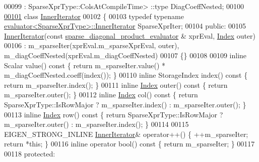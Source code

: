 \begin{DoxyCode}
00099                                                                        : SparseXprType::ColsAtCompileTime>
      ::type DiagCoeffNested;
00100   
\hyperlink{class_eigen_1_1internal_1_1sparse__diagonal__product__evaluator_3_01_sparse_xpr_type_00_01_diag_f44167c623880e382ac76ec71f78299c}{00101}   \textcolor{keyword}{class }\hyperlink{class_eigen_1_1_inner_iterator}{InnerIterator}
00102   \{
00103     \textcolor{keyword}{typedef} \textcolor{keyword}{typename} \hyperlink{struct_eigen_1_1internal_1_1evaluator}{evaluator<SparseXprType>::InnerIterator} 
      SparseXprIter;
00104   \textcolor{keyword}{public}:
00105     \hyperlink{class_eigen_1_1_inner_iterator}{InnerIterator}(\textcolor{keyword}{const} \hyperlink{struct_eigen_1_1internal_1_1sparse__diagonal__product__evaluator}{sparse\_diagonal\_product\_evaluator} &
      xprEval, \hyperlink{namespace_eigen_a62e77e0933482dafde8fe197d9a2cfde}{Index} outer)
00106       : m\_sparseIter(xprEval.m\_sparseXprEval, outer), m\_diagCoeffNested(xprEval.m\_diagCoeffNested)
00107     \{\}
00108     
00109     \textcolor{keyword}{inline} Scalar value()\textcolor{keyword}{ const }\{ \textcolor{keywordflow}{return} m\_sparseIter.value() * m\_diagCoeffNested.coeff(index()); \}
00110     \textcolor{keyword}{inline} StorageIndex index()\textcolor{keyword}{ const  }\{ \textcolor{keywordflow}{return} m\_sparseIter.index(); \}
00111     \textcolor{keyword}{inline} \hyperlink{namespace_eigen_a62e77e0933482dafde8fe197d9a2cfde}{Index} outer()\textcolor{keyword}{ const  }\{ \textcolor{keywordflow}{return} m\_sparseIter.outer(); \}
00112     \textcolor{keyword}{inline} \hyperlink{namespace_eigen_a62e77e0933482dafde8fe197d9a2cfde}{Index} col()\textcolor{keyword}{ const    }\{ \textcolor{keywordflow}{return} SparseXprType::IsRowMajor ? m\_sparseIter.index() : 
      m\_sparseIter.outer(); \}
00113     \textcolor{keyword}{inline} \hyperlink{namespace_eigen_a62e77e0933482dafde8fe197d9a2cfde}{Index} row()\textcolor{keyword}{ const    }\{ \textcolor{keywordflow}{return} SparseXprType::IsRowMajor ? m\_sparseIter.outer() : 
      m\_sparseIter.index(); \}
00114     
00115     EIGEN\_STRONG\_INLINE \hyperlink{class_eigen_1_1_inner_iterator}{InnerIterator}& operator++() \{ ++m\_sparseIter; \textcolor{keywordflow}{return} *\textcolor{keyword}{this}; \}
00116     \textcolor{keyword}{inline} \textcolor{keyword}{operator} bool()\textcolor{keyword}{ const  }\{ \textcolor{keywordflow}{return} m\_sparseIter; \}
00117     
00118   \textcolor{keyword}{protected}:

\end{DoxyCode}
